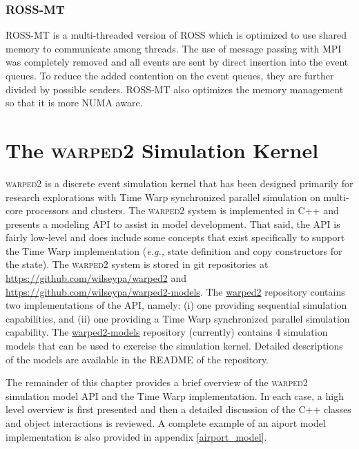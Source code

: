 \documentclass[11pt]{book}
\begin{document}
\subsection{ROSS-MT}

ROSS-MT \cite{jagtap-12} is a multi-threaded version of ROSS which is optimized to use
shared memory to communicate among threads.  The use of message passing with MPI was
completely removed and all events are sent by direct insertion into the event queues.  To
reduce the added contention on the event queues, they are further divided by possible
senders.  ROSS-MT also optimizes the memory management so that it is more NUMA aware.



\chapter[\textsc{warped2}]{The \textsc{warped2} Simulation Kernel}\label{warped2_overview}

\textsc{warped2} is a discrete event simulation kernel that has been designed primarily for research
explorations with Time Warp synchronized parallel simulation on multi-core processors and clusters.
The \textsc{warped2} system is implemented in C++ and presents a modeling API to assist in model
development.  That said, the API is fairly low-level and does include some concepts that exist
specifically to support the Time Warp implementation (\emph{e.g.,} state definition and copy
constructors for the state).  The \textsc{warped2} system is stored in git repositories at
\url{https://github.com/wilseypa/warped2} and \url{https://github.com/wilseypa/warped2-models}.  The
\url{warped2} repository contains two implementations of the API, namely: (i) one providing
sequential simulation capabilities, and (ii) one providing a Time Warp synchronized parallel
simulation capability.  The \url{warped2-models} repository (currently) contains 4 simulation models
that can be used to exercise the simulation kernel.  Detailed descriptions of the models are
available in the README of the repository.


The remainder of this chapter provides a brief overview of the \textsc{warped2} simulation model API
and the Time Warp implementation.  In each case, a high level overview is first presented and then a
detailed discussion of the C++ classes and object interactions is reviewed.  A complete example
of an aiport model implementation is also provided in appendix \ref{airport_model}.
\end{document}
